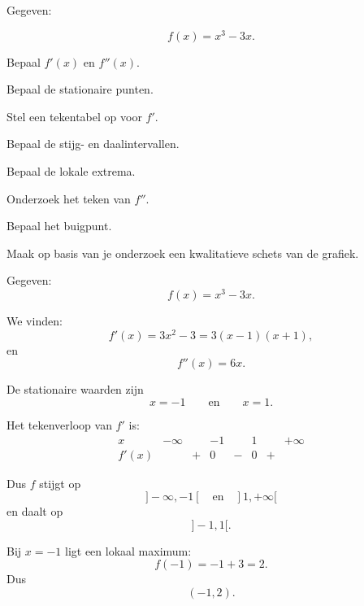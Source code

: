 \documentclass{ximera}
\begin{document}
\begin{oefening}{\oefB\ESS}

Gegeven:

\[
f(x)=x^3-3x.
\]

\begin{question}
Bepaal $f'(x)$ en $f''(x)$.
\end{question}

\begin{question}
Bepaal de stationaire punten.
\end{question}

\begin{question}
Stel een tekentabel op voor $f'$.
\end{question}

\begin{question}
Bepaal de stijg- en daalintervallen.
\end{question}

\begin{question}
Bepaal de lokale extrema.
\end{question}

\begin{question}
Onderzoek het teken van $f''$.
\end{question}

\begin{question}
Bepaal het buigpunt.
\end{question}

\begin{question}
Maak op basis van je onderzoek een kwalitatieve schets van de grafiek.
\end{question}

\begin{oplossing}

Gegeven:
\[
f(x)=x^3-3x.
\]

We vinden:
\[
f'(x)=3x^2-3=3(x-1)(x+1),
\]
en
\[
f''(x)=6x.
\]

De stationaire waarden zijn
\[
x=-1
\qquad\text{en}\qquad
x=1.
\]

Het tekenverloop van $f'$ is:
\[
\begin{array}{c|ccccccc}
x & -\infty & & -1 & & 1 & & +\infty\\ \hline
f'(x) & & + & 0 & - & 0 & + &
\end{array}
\]

Dus $f$ stijgt op
\[
]-\infty,-1[
\quad\text{en}\quad
]1,+\infty[
\]
en daalt op
\[
]-1,1[.
\]

Bij $x=-1$ ligt een lokaal maximum:
\[
f(-1)=-1+3=2.
\]
Dus
\[
\boxed{(-1,2)}.
\]


\end{oplossing}
\end{oefening}
\end{document}
